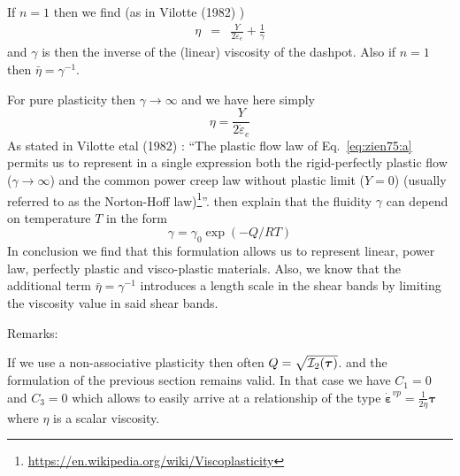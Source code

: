 If $n=1$ then we find (as in Vilotte \etal (1982) \cite{vidm82})
\begin{eqnarray}
\eta 
&=& \frac{ Y }{2  \dot\varepsilon_e}
+ \frac{1 }{\gamma } 
\end{eqnarray}
and $\gamma$ is then the inverse of the (linear) viscosity of the dashpot.
Also if $n=1$ then $\bar\eta=\gamma^{-1}$.

For pure plasticity then $\gamma \rightarrow \infty$ and we have here simply
\[
\eta = \frac{Y}{2  \dot\varepsilon_e}
\]
As stated in Vilotte etal (1982) \cite{vidm82}: ``The plastic
flow law of Eq.~\eqref{eq:zien75:a} permits us to
represent in a single expression both the rigid-perfectly plastic flow
($\gamma\rightarrow \infty$)
and the common power creep law without plastic limit ($Y=0$)
(usually referred to as the Norton-Hoff law)\footnote{\url{https://en.wikipedia.org/wiki/Viscoplasticity}}''.
\textcite{vidm82} then explain that the fluidity $\gamma$ can depend on 
temperature $T$ in the form 
\[
\gamma = \gamma_0 \exp(-Q/RT)
\]
In conclusion we find that this formulation allows us to represent linear, power law,
perfectly plastic and visco-plastic materials.
Also, we know that the additional term $\bar\eta=\gamma^{-1}$ introduces a length scale
in the shear bands by limiting the viscosity value in said shear bands.

Remarks:


If we use a non-associative plasticity then often $Q=\sqrt{{\cal I}_2(\bm\tau)}$.
and the formulation of the previous section remains valid. In that case 
we have $C_1=0$ and $C_3=0$ which allows to easily arrive at a relationship 
of the type $\dot{\bm\varepsilon}^{vp} = \frac{1}{2\eta} \bm\tau$ where 
$\eta$ is a scalar viscosity. 

